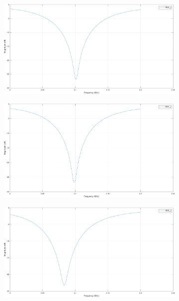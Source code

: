 \documentclass[12pt,a4paper]{article}
\begin{document}
{\begin{figure}[h]
\begin{center}
			\begin{subfigure}{0.5\linewidth}
				\includegraphics[scale=0.25]{gamma1.pdf}
			\end{subfigure}
			\begin{subfigure}{0.5\linewidth}
				\includegraphics[scale=0.25]{gamma3.pdf}
			\end{subfigure}
			\begin{subfigure}{0.5\linewidth}
				\includegraphics[scale=0.25]{gamma4.pdf}
			\end{subfigure}

\end{center}
\end{figure}}
\end{document}
